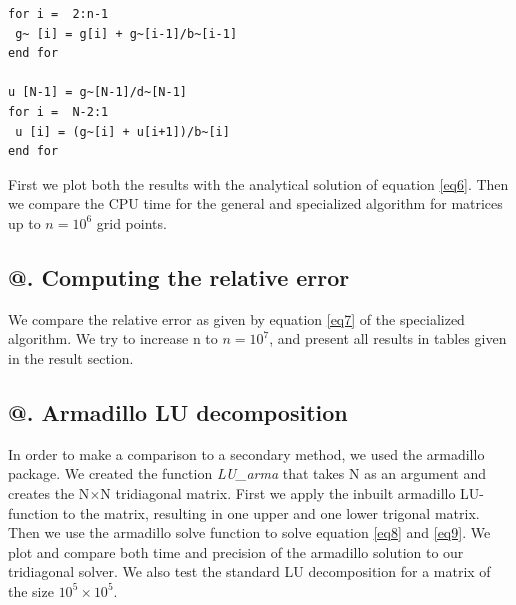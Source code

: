 \documentclass[%
reprint,
amsmath,amssymb,
aps,
]{revtex4-1}
\makeatletter
\newcommand*{\rom}[1]{\expandafter\@slowromancap\romannumeral #1@}
\makeatother
\begin{document}
\begin{lstlisting}[basicstyle=\ttfamily]
for i =  2:n-1
 g~ [i] = g[i] + g~[i-1]/b~[i-1]             
end for

u [N-1] = g~[N-1]/d~[N-1]
for i =  N-2:1
 u [i] = (g~[i] + u[i+1])/b~[i]             
end for
\end{lstlisting} 

\noindent First we plot both the results with the analytical solution of equation \ref{eq6}. Then we compare the CPU time for the general and specialized algorithm for matrices up to $n = 10^6$ grid points.  

\subsection*{\rom{4}. Computing the relative error}
We compare the relative error as given by equation \ref{eq7} of the specialized algorithm. We try to increase n to $n = 10^7$, and present all results in tables given in the result section. 

\subsection*{\rom{5}. Armadillo LU decomposition}
\noindent In order to make a comparison to a secondary method, we used the armadillo package. We created the function \textit{LU\_arma} that takes N as an argument and creates the N$\times$N tridiagonal matrix. First we apply the inbuilt armadillo LU-function to the matrix, resulting in one upper and one lower trigonal matrix. Then we use the armadillo solve function to solve equation \ref{eq8} and \ref{eq9}. We plot and compare both time and precision of the armadillo solution to our tridiagonal solver. We also test the standard LU decomposition for a matrix of the size $10^5 \times 10^5$. 
\end{document}
